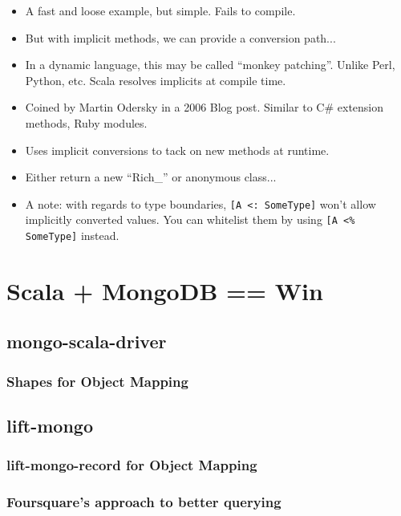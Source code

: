 \documentclass{beamer}
\newenvironment{itemizeframe}
               {\begin{frame}\startitemizeframe} 
               {\stopitemizeframe\end{frame}}
\newcommand\startitemizeframe{\begin{itemize}} \newcommand\stopitemizeframe{\end{itemize}}
\begin{document}
\begin{itemizeframe}
\begin{itemizeframe}
\begin{itemize}
            \item<2-> A fast and loose example, but simple.  Fails to compile.
            \item<3-> But with implicit methods, we can provide a conversion path...
                
            \item<4-> In a dynamic language, this may be called ``monkey patching''. Unlike Perl, Python, etc. Scala resolves implicits at compile time.
        \end{itemize}
\end{itemizeframe}

\begin{itemizeframe}
    \frametitle{Pimp My Library}
    \item Coined by Martin Odersky in a 2006 Blog post.  Similar to C\# extension methods, Ruby modules.
    \item<2-> Uses implicit conversions to tack on new methods at runtime.
    \item<3-> Either return a new ``Rich\_'' or anonymous class...
        
    \item<3-> A note: with regards to type boundaries, \texttt{[A <: SomeType]} won't allow implicitly converted values.  You can whitelist them by using \texttt{[A <\% SomeType]} instead.
\end{itemizeframe}
\section{Scala + MongoDB == Win}
\subsection{mongo-scala-driver}
\subsubsection{Shapes for Object Mapping}

\subsection{lift-mongo}
\subsubsection{lift-mongo-record for Object Mapping}
\subsubsection{Foursquare's approach to better querying}


\end{itemizeframe}
\end{document}
